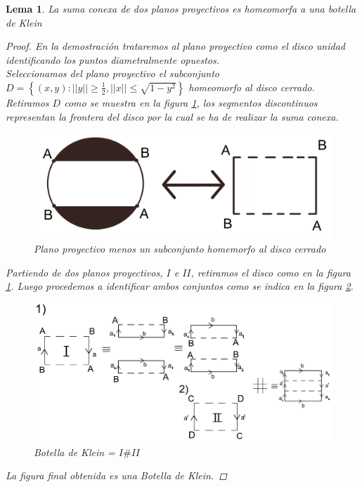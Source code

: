 \documentclass[a4paper,11pt,spanish, twoside, leqno]{tfg-uam}
\newtheorem{lema}[teor]{Lema}
\theoremstyle{definition}
\begin{document}
\begin{lema}\label{lema:SumaDosPlanospEsKlein}
La suma conexa de dos planos proyectivos es homeomorfa a una botella de Klein

\begin{proof}
En la demostración trataremos al plano proyectivo como el disco unidad identificando los puntos diametralmente opuestos.\\
Seleccionamos del plano proyectivo el subconjunto $D = \left\{(x,y): ||y||\geq\frac{1}{2}, ||x||\leq\sqrt{1-y^2} \right\}$  homeomorfo al disco cerrado. Retiramos $ D $ como se muestra en la figura \ref{fig:planop sin D}, los segmentos discontinuos representan la frontera del disco por la cual se ha de realizar la suma conexa.

\begin{figure}[h!]
	\centering
	\includegraphics[width=0.4\linewidth]{imagenes/planop_sinD.png}
	\caption{Plano proyectivo menos un subconjunto homemorfo al disco cerrado}
	\label{fig:planop sin D}
\end{figure} 

\noindent Partiendo de dos planos proyectivos,  $I$ e $II$, retiramos el disco como en la figura \ref{fig:planop sin D}. Luego procedemos a identificar ambos conjuntos como se indica en la figura \ref{fig:sumaconexadeppsEnLema}.

\begin{figure}[h!]
	\centering
	\includegraphics[width=0.8\linewidth]{imagenes/sumappsEnLema.png}
	\caption{Botella de Klein = $ I \# II$}
	\label{fig:sumaconexadeppsEnLema}
\end{figure} 

La figura final obtenida  es una Botella de Klein.
\end{proof}
\end{lema}
\end{document}
